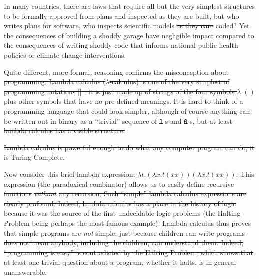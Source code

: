 \documentclass{comjnl}
\providecommand{\DIFadd}[1]{{\protect\color{blue}\uwave{#1}}} %
\providecommand{\DIFdel}[1]{{\protect\color{red}\sout{#1}}}                      %
\providecommand{\DIFaddbegin}{} %
\providecommand{\DIFaddend}{} %
\providecommand{\DIFdelbegin}{} %
\providecommand{\DIFdelend}{} %
\begin{document}
{\DIFaddend In many countries, there are laws that require all but the very simplest \DIFaddbegin \DIFadd{building }\DIFaddend structures to be formally approved from plans and inspected as they are built, but who writes plans for software, who inspects scientific models \DIFdelbegin \DIFdel{as they care }\DIFdelend \DIFaddbegin \DIFadd{while they are being }\DIFaddend coded? Yet the consequences of building a shoddy garage have negligible impact compared to the consequences of writing \DIFdelbegin \DIFdel{shoddy }\DIFdelend \DIFaddbegin \DIFadd{poor }\DIFaddend code that informs national public health policies or climate change interventions.

\DIFdelbegin \DIFdel{Quite different, more formal, reasoning confirms the misconception about programming. Lambda calculus ($\lambda$-calculus) is one of the very simplest of programming notations []
; it is just made up of strings of the four symbols $\lambda.()$ plus other symbols that have no pre-defined meanings. It is hard to think of a programming language that could look simpler, although of course anything can be written out in binary as a ``trivial'' sequence of }\texttt{\DIFdel{1}}%
\DIFdel{s and }\texttt{\DIFdel{0}}%
\DIFdel{s, but at least lambda calculus has a visible structure. 
}%

\DIFdel{Lambda calculus is powerful enough to do what any computer program can do; it is Turing Complete. 
}%

\DIFdel{Now consider this brief lambda expression: $\lambda t. (\lambda x. t (x x)) (\lambda x. t (x x))$. This expression  (the paradoxical combinator) allows us to easily define recursive functions }\emph{\DIFdel{without\/}} %
\DIFdel{any recursion. Such ``simple'' lambda calculus expressions are clearly profound. Indeed, lambda calculus has a place in the history of logic because it was the source of the first undecidable logic problems (the Halting Problem being perhaps the most famous example). Lambda calculus thus proves that simple programs are }\emph{\DIFdel{not\/}} %
\DIFdel{simple; just because children can write programs does not mean anybody, including the children, can understand them. Indeed, ``programming is easy'' is contradicted by the Halting Problem, which shows that at least one trivial question about a program, whether it halts, is in general unanswerable.
}%

}
\end{document}
